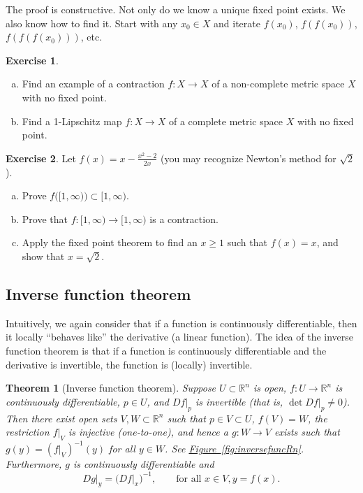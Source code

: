 \documentclass[12pt,openany]{book}
\newcommand{\R}{{\mathbb{R}}}
\newcommand{\myquote}[1]{``#1''}
\theoremstyle{plain}
\newtheorem{thm}{Theorem}[section]
\theoremstyle{remark}
\theoremstyle{definition}
\newenvironment{exbox}{%
    \def\FrameCommand{\vrule width 1pt \relax\hspace{10pt}}%
    \MakeFramed{\advance\hsize-\width\FrameRestore}%
}{%
    \endMakeFramed
}
\newenvironment{exparts}{%
    \leavevmode\begin{enumerate}[a),noitemsep,topsep=0pt,parsep=0pt,partopsep=0pt]
}{%
    \end{enumerate}
}
\theoremstyle{exercise}
\newtheorem{exercise}{Exercise}[section]
\theoremstyle{example}
\newcommand{\figureref}[1]{\hyperref[#1]{Figure~\ref*{#1}}}
\newcommand{\thmref}[1]{\hyperref[#1]{Theorem~\ref*{#1}}}
\begin{document}
The proof is constructive.  Not only do we know 
a unique fixed point exists.  We also know how to find it.  Start with
any $x_0 \in X$ and iterate $f(x_0)$,
$f(f(x_0))$,
$f(f(f(x_0)))$, etc.

\begin{exbox}
\begin{exercise}
\begin{exparts}
\item
Find an example of a contraction $f \colon X \to X$
of a non-complete metric space $X$ with no
fixed point.
\item
Find a 1-Lipschitz map $f \colon X \to X$ of a complete metric space $X$ with no fixed point.
\end{exparts}
\end{exercise}

\begin{exercise}
Let $f(x) = x-\frac{x^2-2}{2x}$ (you may recognize Newton's method for
$\sqrt{2}$).
\begin{exparts}
\item
Prove $f\bigl([1,\infty)\bigr) \subset [1,\infty)$.
\item
Prove that $f \colon [1,\infty) \to [1,\infty)$ is a contraction.
\item
Apply the fixed point theorem to find an $x \geq 1$ such that
$f(x) = x$, and show that $x = \sqrt{2}$.
\end{exparts}
\end{exercise}
\end{exbox}

\subsection{Inverse function theorem}
\label{subsec:svinvfuncthm}

Intuitively, we again consider that if a function is continuously differentiable, then it
locally \myquote{behaves like} the derivative (a linear function).
The idea of the inverse function theorem is that if a function is
continuously differentiable and the derivative is invertible, the function is
(locally) invertible.

\begin{thm}[Inverse function theorem]
\label{thm:inverse}
Suppose $U \subset \R^n$ is open, 
$f \colon U \to \R^n$ is continuously differentiable, $p \in U$, and $Df|_p$ is invertible
(that is, $\det Df|_p \not=0$).
Then there exist open sets $V, W \subset \R^n$ such that
$p \in V \subset U$, $f(V) = W$, the restriction $f|_V$ is injective (one-to-one),
and hence a $g \colon W \to V$ exists such that
$g(y) = (f|_V)^{-1}(y)$ for all $y \in W$.
See \figureref{fig:inversefuncRn}.
Furthermore, $g$ is continuously differentiable
and 
\begin{equation*}
Dg|_y = {\bigl(Df|_x\bigr)}^{-1}, \qquad \text{for all } x \in V, y = f(x).
\end{equation*}
\end{thm}
\end{document}
